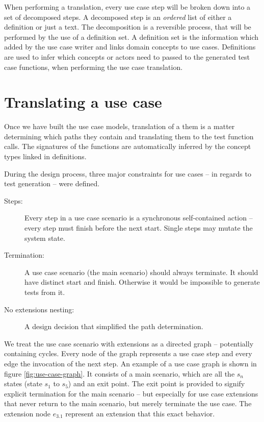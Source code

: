 \noindent When performing a translation, every use case step will be broken down into a set of decomposed steps. A decomposed step is an \emph{ordered} list of either a definition or just a text. The decomposition is a reversible process, that will be performed by the use of a definition set. A definition set is the information which added by the use case writer and links domain concepts to use cases. Definitions are used to infer which concepts or actors need to passed to the generated test case functions, when performing the use case translation.

\section{Translating a use case}
Once we have built the use case models, translation of a them is a matter determining which paths they contain and translating them to the test function calls. The signatures of the functions are automatically inferred by the concept types linked in definitions.\medskip

\noindent During the design process, three major constraints for use cases -- in regards to test generation -- were defined. 
\begin{description}
  \item[Steps:] Every step in a use case scenario is a synchronous self-contained action -- every step must finish before the next start. Single steps may mutate the system state.
  \item[Termination:] A use case scenario (the main scenario) should always terminate. It should have distinct start and finish. Otherwise it would be impossible to generate tests from it.
  \item[No extensions nesting:] A design decision that simplified the path determination.
\end{description}
We treat the use case scenario with extensions as a directed graph -- potentially containing cycles. Every node of the graph represents a use case step and every edge the invocation of the next step. An example of a use case graph is shown in figure \ref{fig:use-case-graph}. It consists of a main scenario, which are all the $s_n$ states (state $s_1$ to $s_5$) and an exit point. The exit point is provided to signify explicit termination for the main scenario -- but especially for use case extensions that never return to the main scenario, but merely terminate the use case. The extension node $e_{3.1}$ represent an extension that this exact behavior.\medskip

